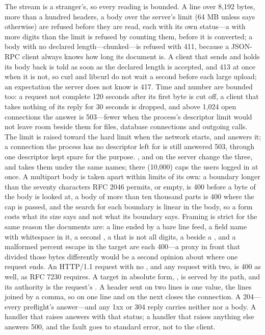 \begin{stnote}
The stream is a stranger's, so every reading is bounded. A line over 8,192
bytes, more than a hundred headers, a body over the server's limit (64 MB
unless  says otherwise) are refused before they are
read, each with its own status---a  with more digits than
the limit is refused by counting them, before it is converted; a body with no declared length---chunked---is
refused with 411, because a JSON-RPC client always knows how long its document
is. A client that sends  and holds its body back is
told  as soon as the declared length is accepted, and 413
at once when it is not, so curl and libcurl do not wait a second before each
large upload; an expectation the server does not know is 417. Time and number are bounded too: a request not complete 120 seconds after
its first byte is cut off, a client that takes nothing of its reply for 30
seconds is dropped, and above 1,024 open connections the answer is 503---fewer
when the process's descriptor limit would not leave room beside them for
files, database connections and outgoing calls. The limit is raised toward
the hard limit when the network starts, and 
answers it; a connection the process has no descriptor left for is still
answered 503, through one descriptor kept spare for the purpose.
,  and  on the
server change the three, and  takes them under the same names;
 there (10,000) caps the users logged in at once. A multipart body is taken apart within limits of its own: a boundary longer
than the seventy characters RFC 2046 permits, or empty, is 400 before a byte of
the body is looked at, a body of more than ten thousand parts is 400 where the
cap is passed, and the search for each boundary is linear in the body, so a
form costs what its size says and not what its boundary says. Framing is
strict for the same reason the documents are: a line ended by a
bare line feed, a field name with whitespace in it, a second
, a  that is not all digits, a
 beside a , and a malformed percent
escape in the target are each 400---a proxy in front that divided those bytes
differently would be a second opinion about where one request ends. An
HTTP/1.1 request with no , and any request with two, is 400 as well,
as RFC 7230 requires. A target in absolute form,
, is served by its path, and its authority is the
request's . A header sent on two lines is one value, the lines
joined by a comma, so  on one line and
 on the next closes the connection. A 204---every
preflight's answer---and any 1xx or 304 reply carries neither
 nor a body. A handler
that raises  answers with that status; a handler that raises
anything else answers 500, and the fault goes to standard error, not to the
client.
\end{stnote}

